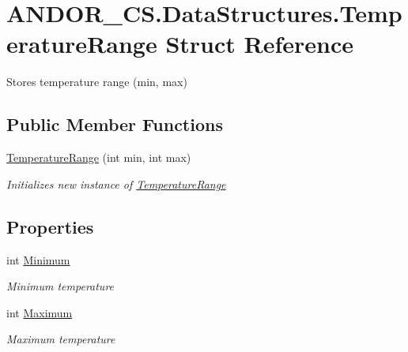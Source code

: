 \hypertarget{struct_a_n_d_o_r___c_s_1_1_data_structures_1_1_temperature_range}{}\section{A\+N\+D\+O\+R\+\_\+\+C\+S.\+Data\+Structures.\+Temperature\+Range Struct Reference}
\label{struct_a_n_d_o_r___c_s_1_1_data_structures_1_1_temperature_range}


Stores temperature range (min, max)  


\subsection*{Public Member Functions}
\begin{DoxyCompactItemize}
\item 
\hyperlink{struct_a_n_d_o_r___c_s_1_1_data_structures_1_1_temperature_range_afc9cdb0f8994ea6b407bb96e24e38311}{Temperature\+Range} (int min, int max)
\begin{DoxyCompactList}\small\item\em Initializes new instance of \hyperlink{struct_a_n_d_o_r___c_s_1_1_data_structures_1_1_temperature_range}{Temperature\+Range} \end{DoxyCompactList}\end{DoxyCompactItemize}
\subsection*{Properties}
\begin{DoxyCompactItemize}
\item 
int \hyperlink{struct_a_n_d_o_r___c_s_1_1_data_structures_1_1_temperature_range_aa3e25e211ab07c4092abed4d81f949c4}{Minimum}
\begin{DoxyCompactList}\small\item\em Minimum temperature \end{DoxyCompactList}\item 
int \hyperlink{struct_a_n_d_o_r___c_s_1_1_data_structures_1_1_temperature_range_a2607488142f499f6d38b12a4b51b3eba}{Maximum}
\begin{DoxyCompactList}\small\item\em Maximum temperature \end{DoxyCompactList}\end{DoxyCompactItemize}


